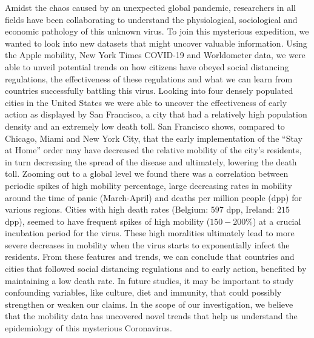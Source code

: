 \documentclass[11pt, english]{article}
\begin{document}
Amidst the chaos caused by an unexpected global pandemic, researchers in all fields have been collaborating to understand the physiological, sociological and economic pathology of this unknown virus. To join this mysterious expedition, we wanted to look into new datasets that might uncover valuable information. Using the Apple mobility, New York Times COVID-19 and Worldometer data, we were able to unveil potential trends on how citizens have obeyed social distancing regulations, the effectiveness of these regulations and what we can learn from countries successfully battling this virus. Looking into four densely populated cities in the United States we were able to uncover the effectiveness of early action as displayed by San Francisco, a city that had a relatively high population density and an extremely low death toll. San Francisco shows, compared to Chicago, Miami and New York City, that the early implementation of the “Stay at Home” order may have decreased the relative mobility of the city’s residents, in turn decreasing the spread of the disease and ultimately, lowering the death toll. Zooming out to a global level we found there was a correlation between periodic spikes of high mobility percentage, large decreasing rates in mobility around the time of panic (March-April) and deaths per million people (dpp) for various regions. Cities with high death rates (Belgium: $597$ dpp, Ireland: $215$ dpp), seemed to have frequent spikes of high mobility ($150-200\%$) at a crucial incubation period for the virus. These high moralities ultimately lead to more severe decreases in mobility when the virus starts to exponentially infect the residents. From these features and trends, we can conclude that countries and cities that followed social distancing regulations and to early action, benefited by maintaining a low death rate. In future studies, it may be important to study confounding variables, like culture, diet and immunity, that could possibly strengthen or weaken our claims. In the scope of our investigation, we believe that the mobility data has uncovered novel trends that help us understand the epidemiology of this mysterious Coronavirus. 
\newpage
\centering
\end{document}
